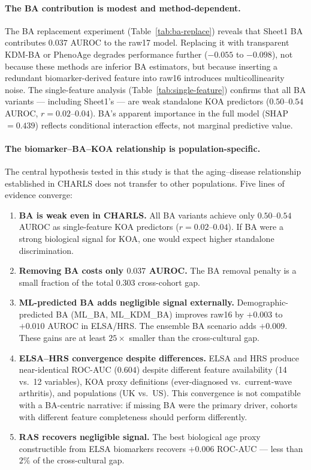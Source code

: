 \documentclass[11pt,a4paper]{article}
\begin{document}
\paragraph{The BA contribution is modest and method-dependent.}
The BA replacement experiment (Table~\ref{tab:ba-replace}) reveals that Sheet1 BA contributes
$0.037$ AUROC to the raw17 model. Replacing it with transparent KDM-BA or PhenoAge degrades
performance further ($-0.055$ to $-0.098$), not because these methods are inferior BA estimators,
but because inserting a redundant biomarker-derived feature into raw16 introduces
multicollinearity noise. The single-feature analysis (Table~\ref{tab:single-feature})
confirms that all BA variants --- including Sheet1's --- are weak standalone KOA predictors
($0.50$--$0.54$ AUROC, $r=0.02$--$0.04$). BA's apparent importance in the full model
(SHAP $= 0.439$) reflects conditional interaction effects, not marginal predictive value.

\paragraph{The biomarker--BA--KOA relationship is population-specific.}
The central hypothesis tested in this study is that the aging--disease relationship
established in CHARLS does not transfer to other populations. Five lines of evidence
converge:

\begin{enumerate}
  \item \textbf{BA is weak even in CHARLS.} All BA variants achieve only $0.50$--$0.54$
        AUROC as single-feature KOA predictors ($r=0.02$--$0.04$). If BA were a strong
        biological signal for KOA, one would expect higher standalone discrimination.
  \item \textbf{Removing BA costs only $0.037$ AUROC.} The BA removal penalty is a small
        fraction of the total $0.303$ cross-cohort gap.
  \item \textbf{ML-predicted BA adds negligible signal externally.} Demographic-predicted
        BA (ML\_BA, ML\_KDM\_BA) improves raw16 by $+0.003$ to $+0.010$ AUROC in ELSA/HRS.
        The ensemble BA scenario adds $+0.009$. These gains are at least $25\times$ smaller
        than the cross-cultural gap.
  \item \textbf{ELSA--HRS convergence despite differences.} ELSA and HRS produce
        near-identical ROC-AUC ($0.604$) despite different feature availability (14 vs.\
        12 variables), KOA proxy definitions (ever-diagnosed vs.\ current-wave arthritis),
        and populations (UK vs.\ US). This convergence is not compatible with a BA-centric
        narrative: if missing BA were the primary driver, cohorts with different feature
        completeness should perform differently.
  \item \textbf{RAS recovers negligible signal.} The best biological age proxy
        constructible from ELSA biomarkers recovers $+0.006$ ROC-AUC --- less than $2\%$
        of the cross-cultural gap.
\end{enumerate}
\end{document}
